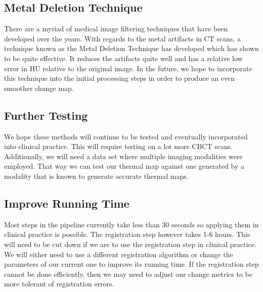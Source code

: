 \documentclass[]{spie}  %
\begin{document}
\subsection{Metal Deletion Technique}

There are a myriad of medical image filtering techniques that have been developed over the years. With regards to the metal artifacts in CT scans, a technique known as the Metal Deletion Technique \cite{Boas11} has developed which has shown to be quite effective. It reduces the artifacts quite well and has a relative low error in HU relative to the original image. In the future, we hope to incorporate this technique into the initial processing steps in order to produce an even smoother change map. 

\subsection{Further Testing}

We hope these methods will continue to be tested and eventually incorporated into clinical practice. This will require testing on a lot more CBCT scans. Additionally, we will need a data set where multiple imaging modalities were employed. That way we can test our thermal map against one generated by a modality that is known to generate accurate thermal maps.

\subsection{Improve Running Time}

Most steps in the pipeline currently take less than 30 seconds so applying them in clinical practice is possible. The registration step however takes 1-6 hours. This will need to be cut down if we are to use the registration step in clinical practice. We will either need to use a different registration algorithm or change the parameters of our current one to improve its running time. If the registration step cannot be done efficiently, then we may need to adjust our change metrics to be more tolerant of registration errors.  



\end{document}
